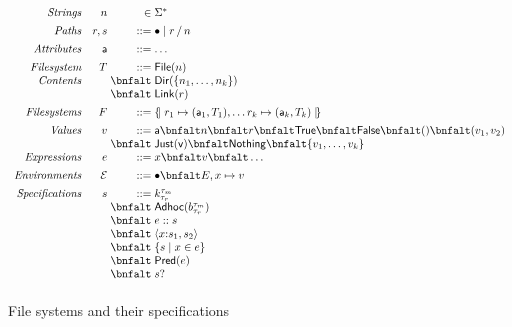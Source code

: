 \begin{figure}
\[
\begin{array}{rr@{\;}r@{\;}l}
\textit{Strings}        & n & \in & \Sigma^{\ast} \\[1ex]
\textit{Paths}          & r,s & \bnfdef & \PNil \mid \PCons{r}{n} \\[1ex]
\textit{Attributes}     & \att  & \bnfdef & \dots\\[1ex]
\textit{Filesystem}     & T  & \bnfdef & \File{n} \\
\textit{Contents}       &    & \bnfalt & \Dir{ \Set{n_1,\dots,n_k} }\\
                        &    & \bnfalt & \Link{r}\\[1ex]
\textit{Filesystems}    & F & \bnfdef & \Map{ r_1 \mapsto (\att_1,T_1), \dots r_k \mapsto (\att_k,T_k) }\\[1ex]
\textit{Values}         & v & \bnfdef & \att \bnfalt n \bnfalt r \bnfalt \True \bnfalt \False \bnfalt () \bnfalt (v_1,v_2) \\
                        &   & \bnfalt & \Just{v} \bnfalt \Nothing \bnfalt \{ v_1,\dots,v_k \}\\
\textit{Expressions}    & e & \bnfdef & x \bnfalt v \bnfalt \dots \\[1ex]
\textit{Environments}   & \Env & \bnfdef & \ENil \bnfalt E,x\mapsto v \\[1ex]
\textit{Specifications} & s & \bnfdef & \Sk \\
                        &   & \bnfalt & \SAdhoc{b}\\
                        &   & \bnfalt & \SPath{e}{s}\\
                        &   & \bnfalt & \SPair{x}{s_1}{s_2}\\
                        &   & \bnfalt & \SSetComp{s}{x}{e}\\
                        &   & \bnfalt & \SPred{e}\\
                        &   & \bnfalt & \SOption{s}\\[1ex]
\end{array}
\]
\caption{File systems and their specifications}
\label{fig:calculus-syntax}
\end{figure}

